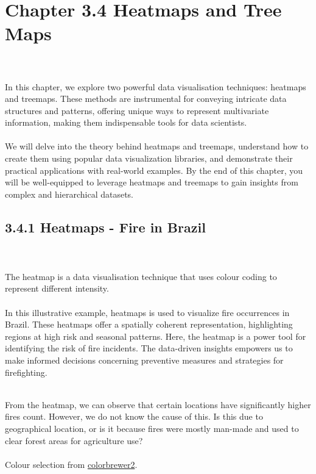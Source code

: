 \documentclass{article}\usepackage[]{graphicx}\usepackage[]{xcolor}
\begin{document}
\section{Chapter 3.4 Heatmaps and Tree Maps}
\\  
\\In this chapter, we explore two powerful data visualisation techniques: heatmaps and treemaps. These methods are instrumental for conveying intricate data structures and patterns, offering unique ways to represent multivariate information, making them indispensable tools for data scientists.
\\  
\\We will delve into the theory behind heatmaps and treemaps, understand how to create them using popular data visualization libraries, and demonstrate their practical applications with real-world examples. By the end of this chapter, you will be well-equipped to leverage heatmaps and treemaps to gain insights from complex and hierarchical datasets.

\subsection{3.4.1 Heatmaps - Fire in Brazil}
\\  
\\The heatmap is a data visualisation technique that uses colour coding to represent different intensity.
\\  
\\In this illustrative example, heatmaps is used to visualize fire occurrences in Brazil. These heatmaps offer a spatially coherent representation, highlighting regions at high risk and seasonal patterns. Here, the heatmap is a power tool for identifying the risk of fire incidents. The data-driven insights empowers us to make informed decisions concerning preventive measures and strategies for firefighting.





\\From the heatmap, we can observe that certain locations have significantly higher fires count. However, we do not know the cause of this. Is this due to geographical location, or is it because fires were mostly man-made and used to clear forest areas for agriculture use?
\\  
\\Colour selection from \href{https://colorbrewer2.org/#type=sequential&scheme=Oranges&n=9}{colorbrewer2}.
\end{document}
